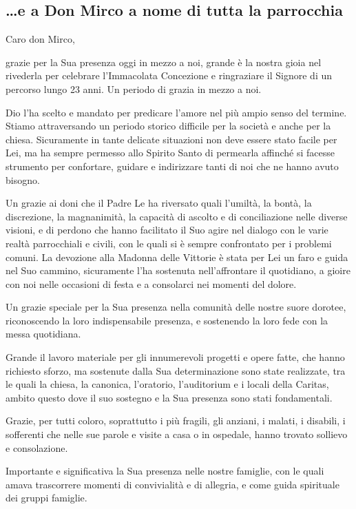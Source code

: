 \subsection{\dots e a Don Mirco a nome di tutta la parrocchia}

Caro don Mirco,

grazie per la Sua presenza oggi in mezzo a noi, grande è la nostra gioia nel rivederla per celebrare l'Immacolata Concezione e ringraziare il Signore di un percorso lungo 23 anni. Un periodo di grazia in mezzo a noi.

Dio l'ha scelto e mandato per predicare l'amore nel più ampio senso del termine. Stiamo attraversando un periodo storico difficile per la società e anche per la chiesa. Sicuramente in tante delicate situazioni non deve essere stato facile per Lei, ma ha sempre permesso allo Spirito Santo di permearla affinché si facesse strumento per confortare, guidare e indirizzare tanti di noi che ne hanno avuto bisogno.

Un grazie ai doni che il Padre Le ha riversato quali l'umiltà, la bontà, la discrezione, la magnanimità, la capacità di ascolto e di conciliazione nelle diverse visioni, e di perdono che hanno facilitato il Suo agire nel dialogo con le varie realtà parrocchiali e civili, con le quali si è sempre confrontato per i problemi comuni. La devozione alla Madonna delle Vittorie è stata per Lei un faro e guida nel Suo cammino, sicuramente l'ha sostenuta nell'affrontare il quotidiano, a gioire con noi nelle occasioni di festa e a consolarci nei momenti del dolore.

Un grazie speciale per la Sua presenza nella comunità delle nostre suore dorotee, riconoscendo la loro indispensabile presenza, e sostenendo la loro fede con la messa quotidiana.

Grande il lavoro materiale per gli innumerevoli progetti e opere fatte, che hanno richiesto sforzo, ma sostenute dalla Sua determinazione sono state realizzate, tra le quali la chiesa, la canonica, l'oratorio, l'auditorium e i locali della Caritas, ambito questo dove il suo sostegno e la Sua presenza sono stati fondamentali.

Grazie, per tutti coloro, soprattutto i più fragili, gli anziani, i malati, i disabili, i sofferenti che nelle sue parole e visite a casa o in ospedale, hanno trovato sollievo e consolazione.

Importante e significativa la Sua presenza nelle nostre famiglie, con le quali amava trascorrere momenti di convivialità e di allegria, e come guida spirituale dei gruppi famiglie.

